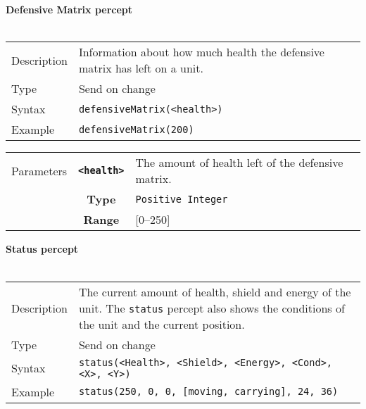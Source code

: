 \\
\\
\noindent
\textbf{Defensive Matrix percept}\\
\\
\begin{tabularx}{\textwidth}{lX}
 Description & Information about how much health the defensive matrix has left on a unit. \\
 Type & Send on change \\
 Syntax & \verb|defensiveMatrix(<health>)| \\
 Example & \verb|defensiveMatrix(200)|   \\   
 \end{tabularx}
 \begin{tabularx}{\textwidth}{l | c | p{8cm}|}
 \cline{2-3} 
 Parameters & \textbf{\verb|<health>|} & The amount of health left of the defensive matrix.\\
            & \textbf{Type} & \verb|Positive Integer| \\
            & \textbf{Range} & [0--250] \\
            \cline{2-3} 
\end{tabularx}
\newpage
\noindent
\textbf{Status percept}\\
\\
\begin{tabularx}{\textwidth}{lX}
 Description & The current amount of health, shield and energy of the unit. The \verb|status| percept also shows the conditions of the unit and the current position. \\
 Type & Send on change \\
 Syntax & \verb|status(<Health>, <Shield>, <Energy>, <Cond>, <X>, <Y>)| \\
 Example & \verb|status(250, 0, 0, [moving, carrying], 24, 36)|   \\ 
 \end{tabularx}\\
